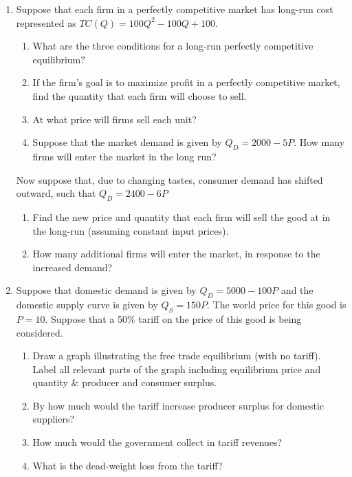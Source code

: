 \documentclass[11pt]{article}
\begin{document}
\begin{enumerate}
  \newpage
  \item Suppose that each firm in a perfectly competitive market has long-run cost represented as $TC(Q) = 100Q^2 - 100Q + 100$.
  \begin{enumerate}
	\item What are the three conditions for a long-run perfectly competitive equilibrium?    
  \vspace*{40mm} 
    \item If the firm's goal is to maximize profit in a perfectly competitive market, find the quantity that each firm will choose to sell.
\vspace*{65mm}
    \item At what price will firms sell each unit?
      \vspace*{45mm} 
    \item Suppose that the market demand is given by $Q_D = 2000 - 5P$. How many firms will enter the market in the long run?
  \end{enumerate}
  \newpage
  Now suppose that, due to changing tastes, consumer demand has shifted outward, such that $Q_D = 2400 - 6P$
  \begin{enumerate}
    \item[(e)] Find the new price and quantity that each firm will sell the good at in the long-run (assuming constant input prices).
\vspace*{75mm}
    \item[(f)] How many additional firms will enter the market, in response to the increased demand?
  \end{enumerate}
  \newpage
  \item Suppose that domestic demand is given by $Q_D = 5000 - 100P$ and the domestic supply curve is given by $Q_S = 150P$.  The world price for this good is $P = 10$.  Suppose that a 50\% tariff on the price of this good is being considered.
  \begin{enumerate}
	\item Draw a graph illustrating the free trade equilibrium (with no tariff).  Label all relevant parts of the graph including equilibrium price and quantity \& producer and consumer surplus.   
  \vspace*{60mm} 
    \item By how much would the tariff increase producer surplus for domestic suppliers?
\vspace*{40mm}
    \item How much would the government collect in tariff revenues?
      \vspace*{44mm} 
    \item What is the dead-weight loss from the tariff?
  \end{enumerate}
\end{enumerate}
\end{document}

